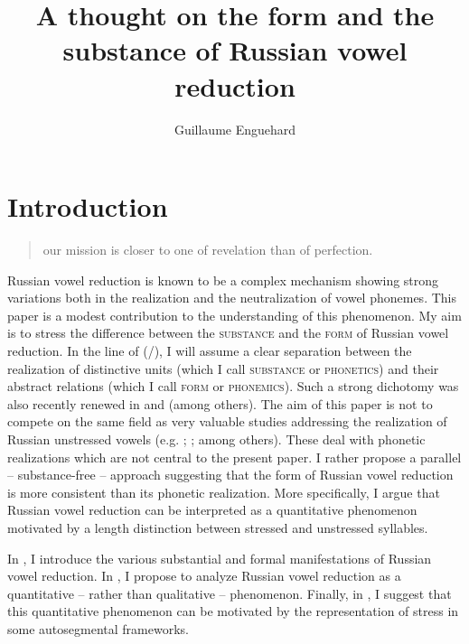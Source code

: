 \documentclass[output=paper,modfonts,newtxmath,hidelinks,]{langscibook}
\title{A thought on the form and the substance of Russian vowel reduction}
\author{Guillaume Enguehard\affiliation{Université d’Orléans, CNRS/LLL}}
\begin{document}
\maketitle
{}

\section{Introduction}

\begin{quotation}
\begin{raggedleft}
[\dots] our mission is closer to one of revelation than of perfection.\\\hfill\citep[132]{Hamilton1980}
\end{raggedleft}
\end{quotation}





  Russian vowel reduction is known to be a complex mechanism showing strong variations both in the realization and the neutralization of vowel phonemes. This paper is a modest contribution to the understanding of this phenomenon. My aim is to stress the difference between the \textsc{substance} and the \textsc{form} of Russian vowel reduction. In the line of \citeauthor{Hjelmslev1943} (\citeyear{Hjelmslev1943}/\citeyear{Hjelmslev1971}), I will assume a clear separation between the realization of distinctive units (which I call \textsc{substance} or \textsc{phonetics}) and their abstract relations (which I call \textsc{form} or \textsc{phonemics}). Such a strong dichotomy was also recently renewed in \citet{Hale-Reiss2000} and \citet{Dresher2008} (among others). The aim of this paper is not to compete on the same field as very valuable studies addressing the realization of Russian unstressed vowels (e.g. \citealt{Crosswhite2000a,Crosswhite2000b}; \citealt{Padgett2004}; among others). These deal with phonetic realizations which are not central to the present paper. I rather propose a parallel -- substance-free -- approach suggesting that the form of Russian vowel reduction is more consistent than its phonetic realization. More specifically, I argue that Russian vowel reduction can be interpreted as a quantitative phenomenon motivated by a length distinction between stressed and unstressed syllables.

In , I introduce the various substantial and formal manifestations of Russian vowel reduction. In , I propose to analyze Russian vowel reduction as a quantitative -- rather than qualitative -- phenomenon. Finally, in , I suggest that this quantitative phenomenon can be motivated by the representation of stress in some autosegmental frameworks.
\end{document}
